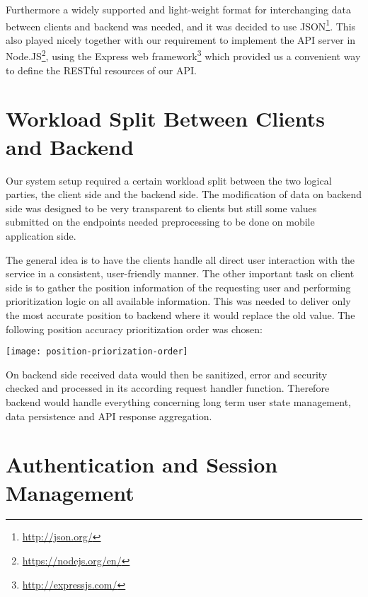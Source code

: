 Furthermore a widely supported and light-weight format for interchanging data between clients and backend was needed, and it was decided to use JSON\footnote{\url{http://json.org/}}. This also played nicely together with our requirement to implement the API server in Node.JS\footnote{\url{https://nodejs.org/en/}}, using the Express web framework\footnote{\url{http://expressjs.com/}} which provided us a convenient way to define the RESTful resources of our API.


\vspace{0.5cm}

\section{Workload Split Between Clients and Backend}

Our system setup required a certain workload split between the two logical parties, the client side and the backend side. The modification of data on backend side was designed to be very transparent to clients but still some values submitted on the endpoints needed preprocessing to be done on mobile application side.

The general idea is to have the clients handle all direct user interaction with the service in a consistent, user-friendly manner. The other important task on client side is to gather the position information of the requesting user and performing prioritization logic on all available information. This was needed to deliver only the most accurate position to backend where it would replace the old value. The following position accuracy prioritization order was chosen:
\begin{center}
    \texttt{[image: position-priorization-order]}\\
    \label{fig:position-priorization}
\end{center}

On backend side received data would then be sanitized, error and security checked and processed in its according request handler function. Therefore backend would handle everything concerning long term user state management, data persistence and API response aggregation.


\vspace{0.5cm}

\section{Authentication and Session Management}
\label{concept-authentication}

